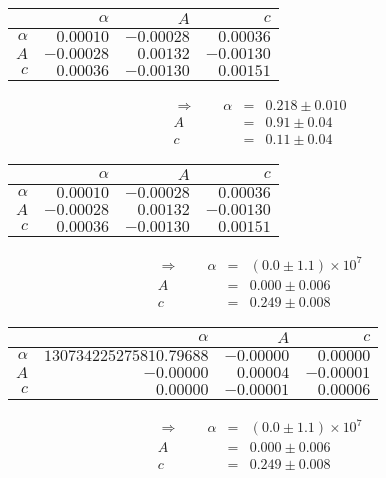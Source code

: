 \begin{tabular}{|r|r|r|r|}
 \hline 
\cellcolor{tabcolor}&\cellcolor{tabcolor}$\alpha$&\cellcolor{tabcolor}$A$&\cellcolor{tabcolor}$c$\\ \hline 
 \cellcolor{tabcolor}$\alpha$&$0.00010$ &$-0.00028$ &$0.00036$ \\ \hline
\cellcolor{tabcolor}$A$&$-0.00028$ &$0.00132$ &$-0.00130$ \\ \hline
\cellcolor{tabcolor}$c$&$0.00036$ &$-0.00130$ &$0.00151$ \\ \hline
\end{tabular}
\begin{align}\Rightarrow \qquad
    \alpha &=& 0.218 \pm 0.010 \\
    A &=& 0.91 \pm 0.04 \\
    c &=& 0.11 \pm 0.04 
\end{align}

 \begin{tabular}{|r|r|r|r|}
 \hline 
\cellcolor{tabcolor}&\cellcolor{tabcolor}$\alpha$&\cellcolor{tabcolor}$A$&\cellcolor{tabcolor}$c$\\ \hline 
 \cellcolor{tabcolor}$\alpha$&$0.00010$ &$-0.00028$ &$0.00036$ \\ \hline
\cellcolor{tabcolor}$A$&$-0.00028$ &$0.00132$ &$-0.00130$ \\ \hline
\cellcolor{tabcolor}$c$&$0.00036$ &$-0.00130$ &$0.00151$ \\ \hline
\end{tabular}
\begin{align}\Rightarrow \qquad
    \alpha &=& \left(0.0 \pm 1.1\right) \times 10^{7} \\
    A &=& 0.000 \pm 0.006 \\
    c &=& 0.249 \pm 0.008 
\end{align}

 \begin{tabular}{|r|r|r|r|}
 \hline 
\cellcolor{tabcolor}&\cellcolor{tabcolor}$\alpha$&\cellcolor{tabcolor}$A$&\cellcolor{tabcolor}$c$\\ \hline 
 \cellcolor{tabcolor}$\alpha$&$130734225275810.79688$ &$-0.00000$ &$0.00000$ \\ \hline
\cellcolor{tabcolor}$A$&$-0.00000$ &$0.00004$ &$-0.00001$ \\ \hline
\cellcolor{tabcolor}$c$&$0.00000$ &$-0.00001$ &$0.00006$ \\ \hline
\end{tabular}
\begin{align}\Rightarrow \qquad
    \alpha &=& \left(0.0 \pm 1.1\right) \times 10^{7} \\
    A &=& 0.000 \pm 0.006 \\
    c &=& 0.249 \pm 0.008 
\end{align}

